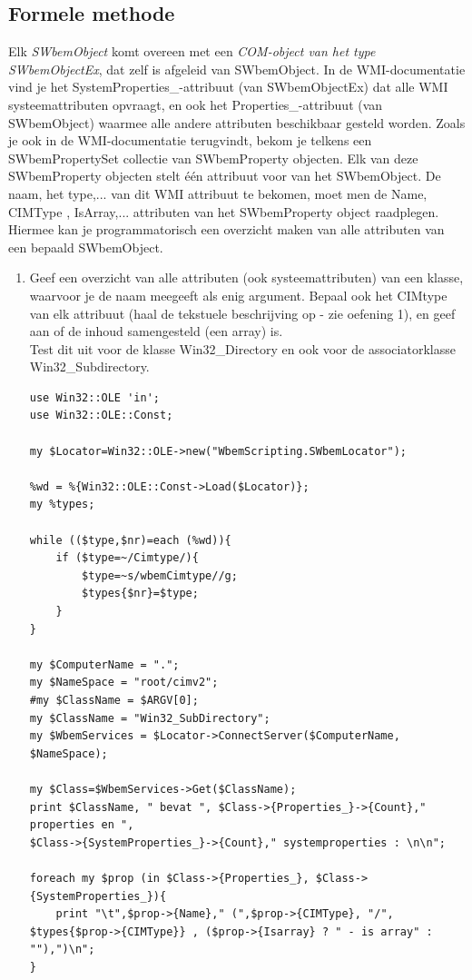 \documentclass[11pt,a4paper]{report}
\begin{document}
\subsection{Formele methode}
Elk \textit{SWbemObject} komt overeen met een \textit{COM-object van het type SWbemObjectEx}, dat zelf is afgeleid van SWbemObject. In de WMI-documentatie vind je het SystemProperties\_-attribuut (van SWbemObjectEx) dat alle WMI systeemattributen opvraagt, en ook het Properties\_-attribuut (van SWbemObject) waarmee alle andere attributen beschikbaar gesteld worden. Zoals je ook in de WMI-documentatie terugvindt, bekom je telkens een SWbemPropertySet collectie van SWbemProperty objecten. Elk van deze SWbemProperty objecten stelt één attribuut voor van het SWbemObject. De naam, het type,... van dit WMI attribuut te bekomen, moet men de Name, CIMType , IsArray,... attributen van het SWbemProperty object raadplegen.
\\Hiermee kan je programmatorisch een overzicht maken van alle attributen van een bepaald SWbemObject.
\begin{enumerate}[resume]
	\item Geef een overzicht van alle attributen (ook systeemattributen) van een klasse, waarvoor je de naam meegeeft als enig argument. Bepaal ook het CIMtype van elk attribuut (haal de tekstuele beschrijving op - zie oefening 1), en geef aan of de inhoud samengesteld (een array) is.
	\\Test dit uit voor de klasse Win32\_Directory en ook voor de associatorklasse Win32\_Subdirectory.
	\begin{lstlisting}
use Win32::OLE 'in';
use Win32::OLE::Const;

my $Locator=Win32::OLE->new("WbemScripting.SWbemLocator");

%wd = %{Win32::OLE::Const->Load($Locator)}; 
my %types;

while (($type,$nr)=each (%wd)){
	if ($type=~/Cimtype/){
		$type=~s/wbemCimtype//g;
		$types{$nr}=$type;
	}
}

my $ComputerName = ".";
my $NameSpace = "root/cimv2";
#my $ClassName = $ARGV[0]; 
my $ClassName = "Win32_SubDirectory";
my $WbemServices = $Locator->ConnectServer($ComputerName, $NameSpace);

my $Class=$WbemServices->Get($ClassName);
print $ClassName, " bevat ", $Class->{Properties_}->{Count}," properties en ", 
$Class->{SystemProperties_}->{Count}," systemproperties : \n\n";

foreach my $prop (in $Class->{Properties_}, $Class->{SystemProperties_}){
	print "\t",$prop->{Name}," (",$prop->{CIMType}, "/", $types{$prop->{CIMType}} , ($prop->{Isarray} ? " - is array" : ""),")\n";
}
	\end{lstlisting}
\end{enumerate}
\end{document}
